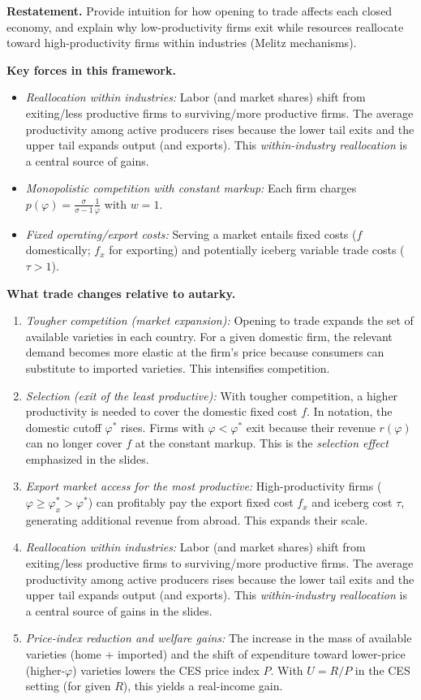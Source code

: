 \begin{solution}
		\textbf{Restatement.} Provide intuition for how opening to trade affects each closed economy, and explain why low-productivity firms exit while resources reallocate toward high-productivity firms within industries (Melitz mechanisms).

\bigskip
		\textbf{Key forces in this framework.}
\begin{itemize}
	\item \emph{Reallocation within industries:} Labor (and market shares) shift from exiting/less productive firms to surviving/more productive firms. The average productivity among active producers rises because the lower tail exits and the upper tail expands output (and exports). This \emph{within-industry reallocation} is a central source of gains.
	\item \emph{Monopolistic competition with constant markup:} Each firm charges $p(\varphi)=\tfrac{\sigma}{\sigma-1}\tfrac{1}{\varphi}$ with $w=1$.
	\item \emph{Fixed operating/export costs:} Serving a market entails fixed costs ($f$ domestically; $f_x$ for exporting) and potentially iceberg variable trade costs ($\tau>1$).
\end{itemize}

\bigskip
	\textbf{What trade changes relative to autarky.}
\begin{enumerate}
	\item \emph{Tougher competition (market expansion):} Opening to trade expands the set of available varieties in each country. For a given domestic firm, the relevant demand becomes more elastic at the firm’s price because consumers can substitute to imported varieties. This intensifies competition.
	\item \emph{Selection (exit of the least productive):} With tougher competition, a higher productivity is needed to cover the domestic fixed cost $f$. In notation, the domestic cutoff $\varphi^*$ rises. Firms with $\varphi<\varphi^*$ exit because their revenue $r(\varphi)$ can no longer cover $f$ at the constant markup. This is the \emph{selection effect} emphasized in the slides.
	\item \emph{Export market access for the most productive:} High-productivity firms ($\varphi\ge \varphi_x^*>\varphi^*$) can profitably pay the export fixed cost $f_x$ and iceberg cost $\tau$, generating additional revenue from abroad. This expands their scale.
	\item \emph{Reallocation within industries:} Labor (and market shares) shift from exiting/less productive firms to surviving/more productive firms. The average productivity among active producers rises because the lower tail exits and the upper tail expands output (and exports). This \emph{within-industry reallocation} is a central source of gains in the slides.
	\item \emph{Price-index reduction and welfare gains:} The increase in the mass of available varieties (home + imported) and the shift of expenditure toward lower-price (higher-$\varphi$) varieties lowers the CES price index $P$. With $U=R/P$ in the CES setting (for given $R$), this yields a real-income gain.
\end{enumerate}


\end{solution}
